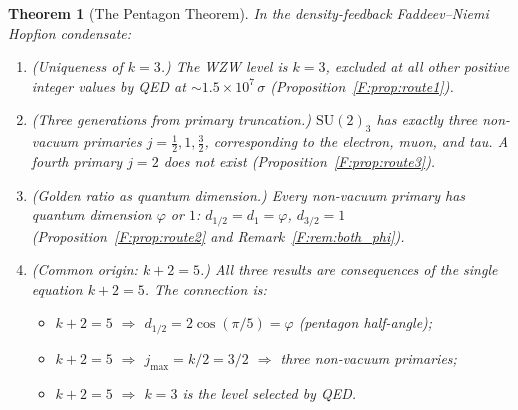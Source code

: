 \documentclass[11pt,a4paper]{article}
\newtheorem{theorem}{Theorem}[section]
\theoremstyle{definition}
\theoremstyle{remark}
\newcommand{\vp}{\varphi}
\begin{document}
\begin{theorem}[The Pentagon Theorem]
\label{F:thm:main}
In the density-feedback Faddeev--Niemi Hopfion condensate:

\begin{enumerate}[label=\emph{(\roman*)}]
  \item \emph{(Uniqueness of $k=3$.)}
    The WZW level is $k=3$, excluded at all other positive integer
    values by QED at $\sim1.5\times10^7\,\sigma$ (Proposition~\ref{F:prop:route1}).

  \item \emph{(Three generations from primary truncation.)}
    $\mathrm{SU}(2)_3$ has exactly three non-vacuum primaries
    $j = \tfrac{1}{2}, 1, \tfrac{3}{2}$, corresponding to the electron,
    muon, and tau.
    A fourth primary $j=2$ does not exist (Proposition~\ref{F:prop:route3}).

  \item \emph{(Golden ratio as quantum dimension.)}
    Every non-vacuum primary has quantum dimension $\vp$ or $1$:
    $d_{1/2} = d_1 = \vp$, $d_{3/2} = 1$ (Proposition~\ref{F:prop:route2}
    and Remark~\ref{F:rem:both_phi}).

  \item \emph{(Common origin: $k+2=5$.)}
    All three results are consequences of the single equation $k+2=5$.
    The connection is:
    \begin{itemize}
      \item $k+2=5$ $\Rightarrow$ $d_{1/2} = 2\cos(\pi/5) = \vp$
        (pentagon half-angle);
      \item $k+2=5$ $\Rightarrow$ $j_{\max}=k/2=3/2$
        $\Rightarrow$ three non-vacuum primaries;
      \item $k+2=5$ $\Rightarrow$ $k=3$ is the level selected by QED.
    \end{itemize}
\end{enumerate}
\end{theorem}
\end{document}
